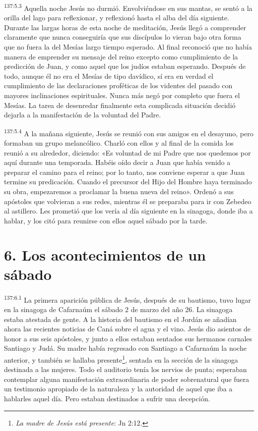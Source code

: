 \par 
\textsuperscript{137:5.3} Aquella noche Jesús no durmió. Envolviéndose en sus mantas, se sentó a la orilla del lago para reflexionar, y reflexionó hasta el alba del día siguiente. Durante las largas horas de esta noche de meditación, Jesús llegó a comprender claramente que nunca conseguiría que sus discípulos lo vieran bajo otra forma que no fuera la del Mesías largo tiempo esperado. Al final reconoció que no había manera de emprender su mensaje del reino excepto como cumplimiento de la predicción de Juan, y como aquel que los judíos estaban esperando. Después de todo, aunque él no era el Mesías de tipo davídico, sí era en verdad el cumplimiento de las declaraciones proféticas de los videntes del pasado con mayores inclinaciones espirituales. Nunca más negó por completo que fuera el Mesías. La tarea de desenredar finalmente esta complicada situación decidió dejarla a la manifestación de la voluntad del Padre.

\par 
\textsuperscript{137:5.4} A la mañana siguiente, Jesús se reunió con sus amigos en el desayuno, pero formaban un grupo melancólico. Charló con ellos y al final de la comida los reunió a su alrededor, diciendo: «Es voluntad de mi Padre que nos quedemos por aquí durante una temporada. Habéis oído decir a Juan que había venido a preparar el camino para el reino; por lo tanto, nos conviene esperar a que Juan termine su predicación. Cuando el precursor del Hijo del Hombre haya terminado su obra, empezaremos a proclamar la buena nueva del reino». Ordenó a sus apóstoles que volvieran a sus redes, mientras él se preparaba para ir con Zebedeo al astillero. Les prometió que los vería al día siguiente en la sinagoga, donde iba a hablar, y los citó para reunirse con ellos aquel sábado por la tarde.

\section*{6. Los acontecimientos de un sábado}
\par 
\textsuperscript{137:6.1} La primera aparición pública de Jesús, después de su bautismo, tuvo lugar en la sinagoga de Cafarnaúm el sábado 2 de marzo del año 26. La sinagoga estaba atestada de gente. A la historia del bautismo en el Jordán se añadían ahora las recientes noticias de Caná sobre el agua y el vino. Jesús dio asientos de honor a sus seis apóstoles, y junto a ellos estaban sentados sus hermanos carnales Santiago y Judá. Su madre había regresado con Santiago a Cafarnaúm la noche anterior, y también se hallaba presente\footnote{\textit{La madre de Jesús está presente}: Jn 2:12.}, sentada en la sección de la sinagoga destinada a las mujeres. Todo el auditorio tenía los nervios de punta; esperaban contemplar alguna manifestación extraordinaria de poder sobrenatural que fuera un testimonio apropiado de la naturaleza y la autoridad de aquel que iba a hablarles aquel día. Pero estaban destinados a sufrir una decepción.

